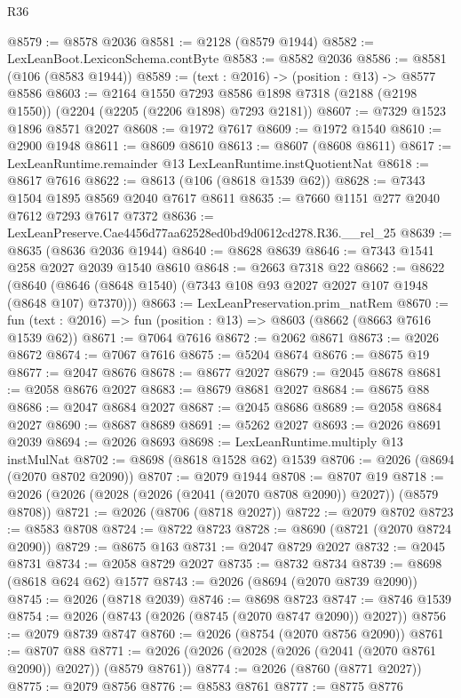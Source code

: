 \begin{lexlean}{R36}
\begin{coremodule}
@8579 := @8578 @2036
@8581 := @2128 (@8579 @1944)
@8582 := LexLeanBoot.LexiconSchema.contByte
@8583 := @8582 @2036
@8586 := @8581 (@106 (@8583 @1944))
@8589 := (text : @2016) -> (position : @13) -> @8577 @8586
@8603 := @2164
    @1550
    @7293
    @8586
    @1898
    @7318
    (@2188 (@2198 @1550))
    (@2204 (@2205 (@2206 @1898) @7293 @2181))
@8607 := @7329 @1523 @1896 @8571 @2027
@8608 := @1972 @7617
@8609 := @1972 @1540
@8610 := @2900 @1948
@8611 := @8609 @8610
@8613 := @8607 (@8608 @8611)
@8617 := LexLeanRuntime.remainder @13 LexLeanRuntime.instQuotientNat
@8618 := @8617 @7616
@8622 := @8613 (@106 (@8618 @1539 @62))
@8628 := @7343 @1504 @1895 @8569 @2040 @7617 @8611
@8635 := @7660 @1151 @277 @2040 @7612 @7293 @7617 @7372
@8636 := LexLeanPreserve.Cae4456d77aa62528ed0bd9d0612cd278.R36.__rel_25
@8639 := @8635 (@8636 @2036 @1944)
@8640 := @8628 @8639
@8646 := @7343 @1541 @258 @2027 @2039 @1540 @8610
@8648 := @2663 @7318 @22
@8662 := @8622
    (@8640 (@8646 (@8648 @1540) (@7343 @108 @93 @2027 @2027 @107 @1948 (@8648 @107) @7370)))
@8663 := LexLeanPreservation.prim_natRem
@8670 := fun (text : @2016) => fun (position : @13) => @8603 (@8662 (@8663 @7616 @1539 @62))
@8671 := @7064 @7616
@8672 := @2062 @8671
@8673 := @2026 @8672
@8674 := @7067 @7616
@8675 := @5204 @8674
@8676 := @8675 @19
@8677 := @2047 @8676
@8678 := @8677 @2027
@8679 := @2045 @8678
@8681 := @2058 @8676 @2027
@8683 := @8679 @8681 @2027
@8684 := @8675 @88
@8686 := @2047 @8684 @2027
@8687 := @2045 @8686
@8689 := @2058 @8684 @2027
@8690 := @8687 @8689
@8691 := @5262 @2027
@8693 := @2026 @8691 @2039
@8694 := @2026 @8693
@8698 := LexLeanRuntime.multiply @13 instMulNat
@8702 := @8698 (@8618 @1528 @62) @1539
@8706 := @2026 (@8694 (@2070 @8702 @2090))
@8707 := @2079 @1944
@8708 := @8707 @19
@8718 := @2026 (@2026 (@2028 (@2026 (@2041 (@2070 @8708 @2090)) @2027)) (@8579 @8708))
@8721 := @2026 (@8706 (@8718 @2027))
@8722 := @2079 @8702
@8723 := @8583 @8708
@8724 := @8722 @8723
@8728 := @8690 (@8721 (@2070 @8724 @2090))
@8729 := @8675 @163
@8731 := @2047 @8729 @2027
@8732 := @2045 @8731
@8734 := @2058 @8729 @2027
@8735 := @8732 @8734
@8739 := @8698 (@8618 @624 @62) @1577
@8743 := @2026 (@8694 (@2070 @8739 @2090))
@8745 := @2026 (@8718 @2039)
@8746 := @8698 @8723
@8747 := @8746 @1539
@8754 := @2026 (@8743 (@2026 (@8745 (@2070 @8747 @2090)) @2027))
@8756 := @2079 @8739 @8747
@8760 := @2026 (@8754 (@2070 @8756 @2090))
@8761 := @8707 @88
@8771 := @2026 (@2026 (@2028 (@2026 (@2041 (@2070 @8761 @2090)) @2027)) (@8579 @8761))
@8774 := @2026 (@8760 (@8771 @2027))
@8775 := @2079 @8756
@8776 := @8583 @8761
@8777 := @8775 @8776

\end{coremodule}
\end{lexlean}
